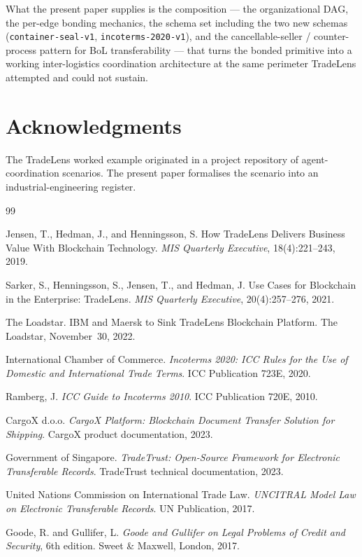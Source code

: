 \documentclass[11pt,a4paper]{article}
\theoremstyle{definition}
\theoremstyle{remark}
\begin{document}
What the present paper supplies is the composition --- the
organizational DAG, the per-edge bonding mechanics, the
schema set including the two new schemas
(\texttt{container-seal-v1}, \texttt{incoterms-2020-v1}), and
the cancellable-seller / counter-process pattern for BoL
transferability --- that turns the bonded primitive into a
working inter-logistics coordination architecture at the same
perimeter TradeLens attempted and could not sustain.

\section*{Acknowledgments}
The TradeLens worked example originated in a project repository
of agent-coordination scenarios. The present paper formalises
the scenario into an industrial-engineering register.

\begin{thebibliography}{99}

Jensen, T., Hedman, J., and Henningsson, S.
\newblock How TradeLens Delivers Business Value With Blockchain
  Technology.
\newblock \emph{MIS Quarterly Executive}, 18(4):221--243, 2019.

Sarker, S., Henningsson, S., Jensen, T., and Hedman, J.
\newblock Use Cases for Blockchain in the Enterprise: TradeLens.
\newblock \emph{MIS Quarterly Executive}, 20(4):257--276, 2021.

The Loadstar.
\newblock IBM and Maersk to Sink TradeLens Blockchain Platform.
\newblock The Loadstar, November~30, 2022.

International Chamber of Commerce.
\newblock \emph{Incoterms 2020: ICC Rules for the Use of Domestic and
  International Trade Terms}.
\newblock ICC Publication 723E, 2020.

Ramberg, J.
\newblock \emph{ICC Guide to Incoterms 2010}.
\newblock ICC Publication 720E, 2010.

CargoX d.o.o.
\newblock \emph{CargoX Platform: Blockchain Document Transfer
  Solution for Shipping}.
\newblock CargoX product documentation, 2023.

Government of Singapore.
\newblock \emph{TradeTrust: Open-Source Framework for Electronic
  Transferable Records}.
\newblock TradeTrust technical documentation, 2023.

United Nations Commission on International Trade Law.
\newblock \emph{UNCITRAL Model Law on Electronic Transferable
  Records}.
\newblock UN Publication, 2017.

Goode, R. and Gullifer, L.
\newblock \emph{Goode and Gullifer on Legal Problems of Credit and
  Security}, 6th edition.
\newblock Sweet \& Maxwell, London, 2017.

\end{thebibliography}
\end{document}
